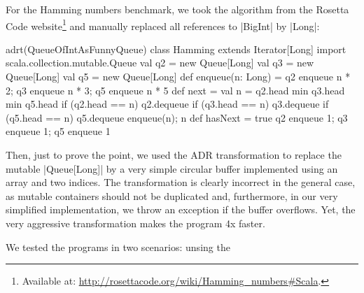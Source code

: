 For the Hamming numbers benchmark, we took the algorithm from the Rosetta Code website\footnote{Available at: \url{http://rosettacode.org/wiki/Hamming_numbers#Scala}.} and manually replaced all references to |BigInt| by |Long|:

\begin{lstlisting-nobreak}
adrt(QueueOfIntAsFunnyQueue) {
  class Hamming extends Iterator[Long] {
    import scala.collection.mutable.Queue
    val q2 = new Queue[Long]
    val q3 = new Queue[Long]
    val q5 = new Queue[Long]
    def enqueue(n: Long) =
      q2 enqueue n * 2; q3 enqueue n * 3; q5 enqueue n * 5
    def next = {
      val n = q2.head min q3.head min q5.head
      if (q2.head == n) q2.dequeue
      if (q3.head == n) q3.dequeue
      if (q5.head == n) q5.dequeue
      enqueue(n); n
    }
    def hasNext = true
    q2 enqueue 1; q3 enqueue 1; q5 enqueue 1
  }
}
\end{lstlisting-nobreak}

Then, just to prove the point, we used the ADR transformation to replace the mutable |Queue[Long]| by a very simple circular buffer implemented using an array and two indices. The transformation is clearly incorrect in the general case, as mutable containers should not be duplicated and, furthermore, in our very simplified implementation, we throw an exception if the buffer overflows. Yet, the very aggressive transformation makes the program 4x faster.

We tested the programs in two scenarios: unsing the


